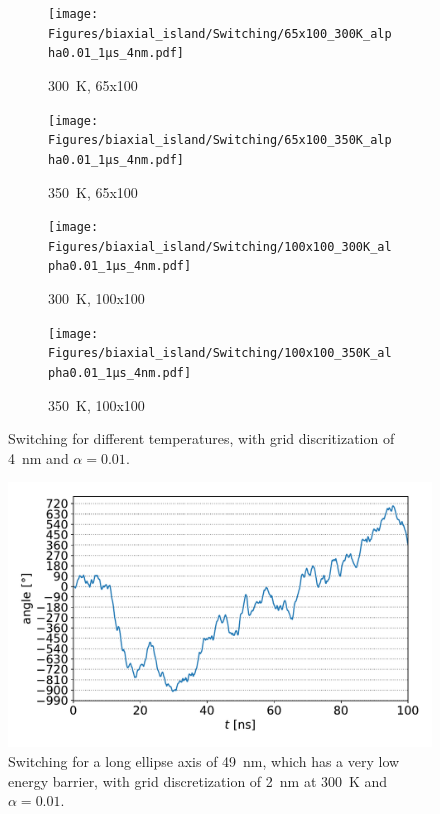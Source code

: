 \documentclass[10pt,a4paper]{article}
\begin{document}
\begin{figure}
     \centering
     \begin{subfigure}[b]{0.49\textwidth}
         \centering
         \texttt{[image: Figures/biaxial\_island/Switching/65x100\_300K\_alpha0.01\_1µs\_4nm.pdf]}
         \caption{\SI{300}{\kelvin}, 65x100}
         \label{fig:switching-temp-300-65x100}
     \end{subfigure}
     \hfill
     \begin{subfigure}[b]{0.49\textwidth}
         \centering
         \texttt{[image: Figures/biaxial\_island/Switching/65x100\_350K\_alpha0.01\_1µs\_4nm.pdf]}
         \caption{\SI{350}{\kelvin}, 65x100}
         \label{fig:switching-temp-350-65x100}
     \end{subfigure}
     \begin{subfigure}[b]{0.49\textwidth}
         \centering
         \texttt{[image: Figures/biaxial\_island/Switching/100x100\_300K\_alpha0.01\_1µs\_4nm.pdf]}
         \caption{\SI{300}{\kelvin}, 100x100}
         \label{fig:switching-temp-300-100x100}
     \end{subfigure}
     \hfill
     \begin{subfigure}[b]{0.49\textwidth}
         \centering
         \texttt{[image: Figures/biaxial\_island/Switching/100x100\_350K\_alpha0.01\_1µs\_4nm.pdf]}
         \caption{\SI{350}{\kelvin}, 100x100}
         \label{fig:switching-temp-350-100x100}
     \end{subfigure}
        \caption{Switching for different temperatures, with grid discritization of \SI{4}{\nano\metre} and $\alpha = 0.01$.}
        \label{fig:switching-temp}
\end{figure}
\begin{figure}
    \centering
    \includegraphics[width=0.9\columnwidth]{Figures/biaxial_island/Switching/49x100_300K_alpha0.01_100ns_2nm.pdf}
    \caption{Switching for a long ellipse axis of \SI{49}{\nano\metre}, which has a very low energy barrier, with grid discretization of \SI{2}{\nano\metre} at \SI{300}{\kelvin} and $\alpha = 0.01$.}
    \label{fig:switching-49x100-300}
\end{figure}


\newpage


\end{document}
